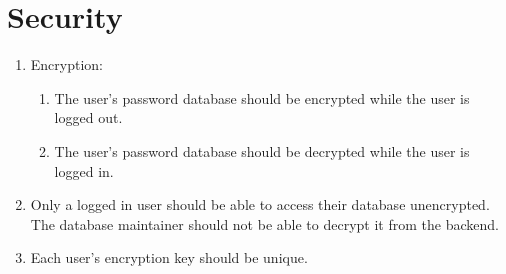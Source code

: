 \section{Security}
\begin{enumerate}[resume*]

    \item Encryption:
          \begin{enumerate}[label={\textbf{\arabic*.}}]
              \item The user's password database should be encrypted while the user is logged out.
              \item The user's password database should be decrypted while the user is logged in.
          \end{enumerate}
    \item Only a logged in user should be able to access their database unencrypted. The database maintainer should not be able to decrypt it from the backend.
    \item Each user's encryption key should be unique.

\end{enumerate}